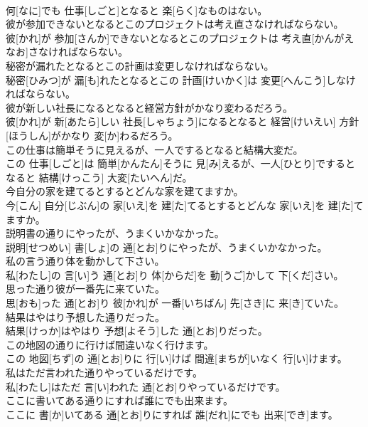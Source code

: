 \documentclass[8pt]{extreport}
\begin{document}
\begin{CJK}{UTF8}{min}
\\	何[なに]でも 仕事[しごと]となると 楽[らく]なものはない。
\\	彼が参加できないとなるとこのプロジェクトは考え直さなければならない。	
\\	彼[かれ]が 参加[さんか]できないとなるとこのプロジェクトは 考え直[かんがえなお]さなければならない。
\\	秘密が漏れたとなるとこの計画は変更しなければならない。	
\\	秘密[ひみつ]が 漏[も]れたとなるとこの 計画[けいかく]は 変更[へんこう]しなければならない。
\\	彼が新しい社長になるとなると経営方針がかなり変わるだろう。	
\\	彼[かれ]が 新[あたら]しい 社長[しゃちょう]になるとなると 経営[けいえい] 方針[ほうしん]がかなり 変[か]わるだろう。
\\	この仕事は簡単そうに見えるが、一人でするとなると結構大変だ。	
\\	この 仕事[しごと]は 簡単[かんたん]そうに 見[み]えるが、一人[ひとり]でするとなると 結構[けっこう] 大変[たいへん]だ。
\\	今自分の家を建てるとするとどんな家を建てますか。	
\\	今[こん] 自分[じぶん]の 家[いえ]を 建[た]てるとするとどんな 家[いえ]を 建[た]てますか。
\\	説明書の通りにやったが、うまくいかなかった。	
\\	説明[せつめい] 書[しょ]の 通[とお]りにやったが、うまくいかなかった。
\\	私の言う通り体を動かして下さい。	
\\	私[わたし]の 言[い]う 通[とお]り 体[からだ]を 動[うご]かして 下[くだ]さい。
\\	思った通り彼が一番先に来ていた。	
\\	思[おも]った 通[とお]り 彼[かれ]が 一番[いちばん] 先[さき]に 来[き]ていた。
\\	結果はやはり予想した通りだった。	
\\	結果[けっか]はやはり 予想[よそう]した 通[とお]りだった。
\\	この地図の通りに行けば間違いなく行けます。	
\\	この 地図[ちず]の 通[とお]りに 行[い]けば 間違[まちが]いなく 行[い]けます。
\\	私はただ言われた通りやっているだけです。	
\\	私[わたし]はただ 言[い]われた 通[とお]りやっているだけです。
\\	ここに書いてある通りにすれば誰にでも出来ます。	
\\	ここに 書[か]いてある 通[とお]りにすれば 誰[だれ]にでも 出来[でき]ます。

\end{CJK}
\end{document}
